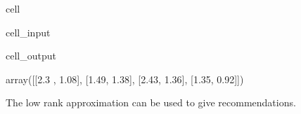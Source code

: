 \documentclass[letterpaper,10pt,english]{jupyterBook}
\begin{document}
\begin{sphinxuseclass}{cell}\begin{sphinxVerbatimInput}

\begin{sphinxuseclass}{cell_input}
\begin{sphinxVerbatim}[commandchars=\\\{\}]
  \PYG{p}{[}\PYG{p}{]}\PYG{p}{[}\PYG{p}{]}
\end{sphinxVerbatim}

\end{sphinxuseclass}\end{sphinxVerbatimInput}
\begin{sphinxVerbatimOutput}

\begin{sphinxuseclass}{cell_output}
\begin{sphinxVerbatim}[commandchars=\\\{\}]
array([[\PYGZhy{}2.3 ,  1.08],
       [\PYGZhy{}1.49,  1.38],
       [\PYGZhy{}2.43, \PYGZhy{}1.36],
       [\PYGZhy{}1.35, \PYGZhy{}0.92]])
\end{sphinxVerbatim}

\end{sphinxuseclass}\end{sphinxVerbatimOutput}

\end{sphinxuseclass}
\sphinxAtStartPar
The low rank approximation can be used to give recommendations.
\end{document}
